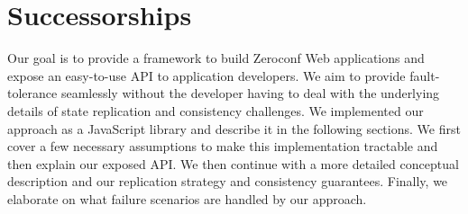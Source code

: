 \section{Successorships}
\label{sec:approach}

Our goal is to provide a framework to build Zeroconf Web applications and expose an easy-to-use API to application developers. 
We aim to provide fault-tolerance seamlessly without the developer having to deal with the underlying details of state replication and consistency challenges. 
We implemented our approach as a JavaScript library and describe it in the following sections.
We first cover a few necessary assumptions to make this implementation tractable and then explain our exposed API. 
We then continue with a more detailed conceptual description and our replication strategy and consistency guarantees.
Finally, we elaborate on what failure scenarios are handled by our approach.









